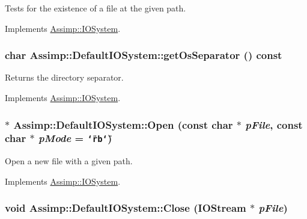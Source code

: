Tests for the existence of a file at the given path. 

Implements \hyperlink{class_assimp_1_1_i_o_system_79f5fe8d2dbe1056c9418f7de9a72445}{Assimp::IOSystem}.\hypertarget{class_assimp_1_1_default_i_o_system_154a94adf38921d9fce50ef598f0a50c}{
\subsubsection[getOsSeparator]{\setlength{\rightskip}{0pt plus 5cm}char Assimp::DefaultIOSystem::getOsSeparator () const}}
\label{class_assimp_1_1_default_i_o_system_154a94adf38921d9fce50ef598f0a50c}


Returns the directory separator. 

Implements \hyperlink{class_assimp_1_1_i_o_system_40e412875b985bdb638f00ef0f20fff6}{Assimp::IOSystem}.\hypertarget{class_assimp_1_1_default_i_o_system_9c8da3d63312f47b2dec83ec90aa2c4d}{
\subsubsection[Open]{$\ast$ Assimp::DefaultIOSystem::Open (const char $\ast$ {\em pFile}, \/  const char $\ast$ {\em pMode} = {\tt \char`\"{}rb\char`\"{}})}}
\label{class_assimp_1_1_default_i_o_system_9c8da3d63312f47b2dec83ec90aa2c4d}


Open a new file with a given path. 

Implements \hyperlink{class_assimp_1_1_i_o_system_c512ece3b0701de5682553007a4c0816}{Assimp::IOSystem}.\hypertarget{class_assimp_1_1_default_i_o_system_a164cf18562082effde576752377bea3}{
\subsubsection[Close]{\setlength{\rightskip}{0pt plus 5cm}void Assimp::DefaultIOSystem::Close ({\bf IOStream} $\ast$ {\em pFile})}}
\label{class_assimp_1_1_default_i_o_system_a164cf18562082effde576752377bea3}


